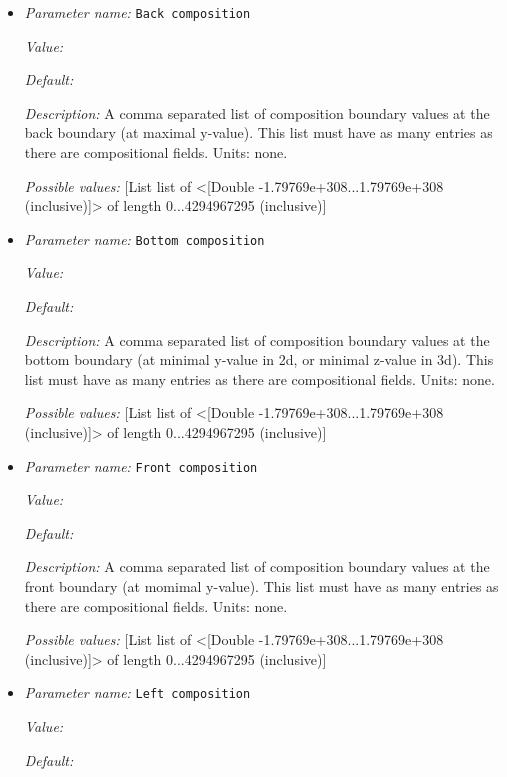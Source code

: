 \begin{itemize}
\item {\it Parameter name:} {\tt Back composition}


{\it Value:} 


{\it Default:} 


{\it Description:} A comma separated list of composition boundary values at the back boundary (at maximal y-value). This list must have as many entries as there are compositional fields. Units: none.


{\it Possible values:} [List list of <[Double -1.79769e+308...1.79769e+308 (inclusive)]> of length 0...4294967295 (inclusive)]
\item {\it Parameter name:} {\tt Bottom composition}


{\it Value:} 


{\it Default:} 


{\it Description:} A comma separated list of composition boundary values at the bottom boundary (at minimal y-value in 2d, or minimal z-value in 3d). This list must have as many entries as there are compositional fields. Units: none.


{\it Possible values:} [List list of <[Double -1.79769e+308...1.79769e+308 (inclusive)]> of length 0...4294967295 (inclusive)]
\item {\it Parameter name:} {\tt Front composition}


{\it Value:} 


{\it Default:} 


{\it Description:} A comma separated list of composition boundary values at the front boundary (at momimal y-value). This list must have as many entries as there are compositional fields. Units: none.


{\it Possible values:} [List list of <[Double -1.79769e+308...1.79769e+308 (inclusive)]> of length 0...4294967295 (inclusive)]
\item {\it Parameter name:} {\tt Left composition}


{\it Value:} 


{\it Default:} 



\end{itemize}

